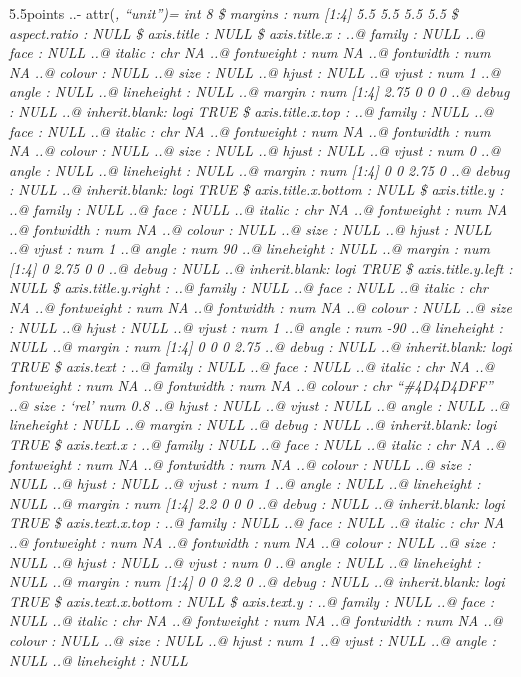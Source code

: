 \documentclass[
]{article}
\begin{document}
5.5points ..- attr(\emph{, ``unit'')= int 8 \$ margins : num {[}1:4{]}
5.5 5.5 5.5 5.5 \$ aspect.ratio : NULL \$ axis.title : NULL \$
axis.title.x : ..@ family : NULL ..@ face : NULL ..@ italic : chr NA ..@
fontweight : num NA ..@ fontwidth : num NA ..@ colour : NULL ..@ size :
NULL ..@ hjust : NULL ..@ vjust : num 1 ..@ angle : NULL ..@ lineheight
: NULL ..@ margin : num {[}1:4{]} 2.75 0 0 0 ..@ debug : NULL ..@
inherit.blank: logi TRUE \$ axis.title.x.top : ..@ family : NULL ..@
face : NULL ..@ italic : chr NA ..@ fontweight : num NA ..@ fontwidth :
num NA ..@ colour : NULL ..@ size : NULL ..@ hjust : NULL ..@ vjust :
num 0 ..@ angle : NULL ..@ lineheight : NULL ..@ margin : num {[}1:4{]}
0 0 2.75 0 ..@ debug : NULL ..@ inherit.blank: logi TRUE \$
axis.title.x.bottom : NULL \$ axis.title.y : ..@ family : NULL ..@ face
: NULL ..@ italic : chr NA ..@ fontweight : num NA ..@ fontwidth : num
NA ..@ colour : NULL ..@ size : NULL ..@ hjust : NULL ..@ vjust : num 1
..@ angle : num 90 ..@ lineheight : NULL ..@ margin : num {[}1:4{]} 0
2.75 0 0 ..@ debug : NULL ..@ inherit.blank: logi TRUE \$
axis.title.y.left : NULL \$ axis.title.y.right : ..@ family : NULL ..@
face : NULL ..@ italic : chr NA ..@ fontweight : num NA ..@ fontwidth :
num NA ..@ colour : NULL ..@ size : NULL ..@ hjust : NULL ..@ vjust :
num 1 ..@ angle : num -90 ..@ lineheight : NULL ..@ margin : num
{[}1:4{]} 0 0 0 2.75 ..@ debug : NULL ..@ inherit.blank: logi TRUE \$
axis.text : ..@ family : NULL ..@ face : NULL ..@ italic : chr NA ..@
fontweight : num NA ..@ fontwidth : num NA ..@ colour : chr
``\#4D4D4DFF'' ..@ size : `rel' num 0.8 ..@ hjust : NULL ..@ vjust :
NULL ..@ angle : NULL ..@ lineheight : NULL ..@ margin : NULL ..@ debug
: NULL ..@ inherit.blank: logi TRUE \$ axis.text.x : ..@ family : NULL
..@ face : NULL ..@ italic : chr NA ..@ fontweight : num NA ..@
fontwidth : num NA ..@ colour : NULL ..@ size : NULL ..@ hjust : NULL
..@ vjust : num 1 ..@ angle : NULL ..@ lineheight : NULL ..@ margin :
num {[}1:4{]} 2.2 0 0 0 ..@ debug : NULL ..@ inherit.blank: logi TRUE \$
axis.text.x.top : ..@ family : NULL ..@ face : NULL ..@ italic : chr NA
..@ fontweight : num NA ..@ fontwidth : num NA ..@ colour : NULL ..@
size : NULL ..@ hjust : NULL ..@ vjust : num 0 ..@ angle : NULL ..@
lineheight : NULL ..@ margin : num {[}1:4{]} 0 0 2.2 0 ..@ debug : NULL
..@ inherit.blank: logi TRUE \$ axis.text.x.bottom : NULL \$ axis.text.y
: ..@ family : NULL ..@ face : NULL ..@ italic : chr NA ..@ fontweight :
num NA ..@ fontwidth : num NA ..@ colour : NULL ..@ size : NULL ..@
hjust : num 1 ..@ vjust : NULL ..@ angle : NULL ..@ lineheight : NULL
}
\end{document}
